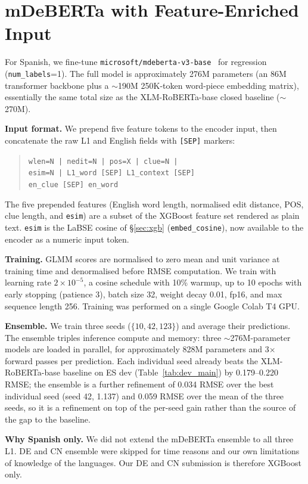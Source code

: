 \documentclass[11pt]{article}
\begin{document}
\section{mDeBERTa with Feature-Enriched Input}
\label{sec:mdeberta}

For Spanish, we fine-tune \texttt{microsoft/mdeberta-v3-base}~\citep{he2023debertav3} for regression (\texttt{num\_labels}=1). The full model is approximately 276M parameters (an 86M transformer backbone plus a $\sim$190M 250K-token word-piece embedding matrix), essentially the same total size as the XLM-RoBERTa-base closed baseline ($\sim$270M).

\textbf{Input format.} We prepend five feature tokens to the encoder input, then concatenate the raw L1 and English fields with \texttt{[SEP]} markers:
\begin{quote}\small\texttt{wlen=N | nedit=N | pos=X | clue=N |\\ esim=N | L1\_word [SEP] L1\_context [SEP]\\ en\_clue [SEP] en\_word}
\end{quote}
The five prepended features (English word length, normalised edit distance, POS, clue length, and \texttt{esim}) are a subset of the XGBoost feature set rendered as plain text. \texttt{esim} is the LaBSE cosine of \S\ref{sec:xgb} (\texttt{embed\_cosine}), now available to the encoder as a numeric input token.

\textbf{Training.} GLMM scores are normalised to zero mean and unit variance at training time and denormalised before RMSE computation. We train with learning rate $2\!\times\!10^{-5}$, a cosine schedule with 10\% warmup, up to 10 epochs with early stopping (patience 3), batch size 32, weight decay 0.01, fp16, and max sequence length 256. Training was performed on a single Google Colab T4 GPU.

\textbf{Ensemble.} We train three seeds ($\{10, 42, 123\}$) and average their predictions. The ensemble triples inference compute and memory: three $\sim$276M-parameter models are loaded in parallel, for approximately 828M parameters and 3$\times$ forward passes per prediction. Each individual seed already beats the XLM-RoBERTa-base baseline on ES dev (Table~\ref{tab:dev_main}) by 0.179--0.220 RMSE; the ensemble is a further refinement of 0.034 RMSE over the best individual seed (seed 42, 1.137) and 0.059 RMSE over the mean of the three seeds, so it is a refinement on top of the per-seed gain rather than the source of the gap to the baseline.

\textbf{Why Spanish only.} We did not extend the mDeBERTa ensemble to all three L1. DE and CN ensemble were skipped for time reasons and our own limitations of knowledge of the languages. Our DE and CN submission is therefore XGBoost only.
\end{document}
